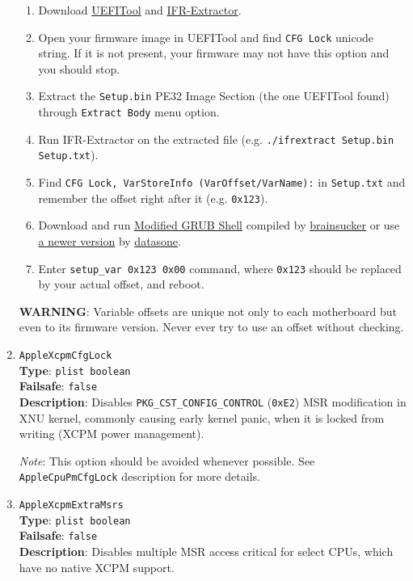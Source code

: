 \documentclass[]{article}
\providecommand{\tightlist}{%
  \setlength{\itemsep}{0pt}\setlength{\parskip}{0pt}}
\begin{document}
\begin{enumerate}
  \begin{enumerate}
    \tightlist
    \item Download \href{https://github.com/LongSoft/UEFITool/releases}{UEFITool} and
      \href{https://github.com/LongSoft/Universal-IFR-Extractor/releases}{IFR-Extractor}.
    \item Open your firmware image in UEFITool and find \texttt{CFG Lock} unicode string.
      If it is not present, your firmware may not have this option and you should stop.
    \item Extract the \texttt{Setup.bin} PE32 Image Section (the one UEFITool found) through
      \texttt{Extract Body} menu option.
    \item Run IFR-Extractor on the extracted file (e.g. \texttt{./ifrextract Setup.bin Setup.txt}).
    \item Find \texttt{CFG Lock, VarStoreInfo (VarOffset/VarName):} in \texttt{Setup.txt} and
      remember the offset right after it (e.g. \texttt{0x123}).
    \item Download and run \href{http://brains.by/posts/bootx64.7z}{Modified GRUB Shell} compiled by
      \href{https://geektimes.com/post/258090}{brainsucker} or use
      \href{https://github.com/datasone/grub-mod-setup_var}{a newer version} by
      \href{https://github.com/datasone}{datasone}.
    \item Enter \texttt{setup\_var 0x123 0x00} command, where \texttt{0x123} should be replaced by
      your actual offset, and reboot.
  \end{enumerate}

  \textbf{WARNING}: Variable offsets are unique not only to each motherboard but even to its firmware
  version. Never ever try to use an offset without checking.

\item
  \texttt{AppleXcpmCfgLock}\\
  \textbf{Type}: \texttt{plist\ boolean}\\
  \textbf{Failsafe}: \texttt{false}\\
  \textbf{Description}: Disables \texttt{PKG\_CST\_CONFIG\_CONTROL} (\texttt{0xE2})
  MSR modification in XNU kernel, commonly causing early kernel panic, when it is
  locked from writing (XCPM power management).

  \emph{Note}: This option should be avoided whenever possible. See \texttt{AppleCpuPmCfgLock}
  description for more details.

\item
  \texttt{AppleXcpmExtraMsrs}\\
  \textbf{Type}: \texttt{plist\ boolean}\\
  \textbf{Failsafe}: \texttt{false}\\
  \textbf{Description}: Disables multiple MSR access critical for select CPUs,
  which have no native XCPM support.


\end{enumerate}
\end{document}
